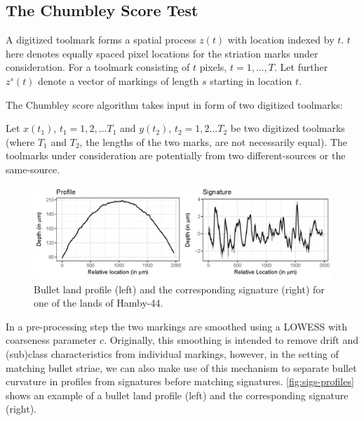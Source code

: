 \documentclass[12pt]{article}
\begin{document}
\subsection{The Chumbley Score Test}\label{the-chumbley-score-test}

A digitized toolmark forms a spatial process \(z(t)\) with location
indexed by \(t\). \(t\) here denotes equally spaced pixel locations for
the striation marks under consideration. For a toolmark consisting of
\(t\) pixels, \(t = 1, ..., T\). Let further \(z^s(t)\) denote a vector
of markings of length \(s\) starting in location \(t\).

The Chumbley score algorithm takes input in form of two digitized
toolmarks:

Let \(x(t_1)\), \(t_1 = 1,2,...T_1\) and \(y(t_2)\), \(t_2 = 1,2...T_2\)
be two digitized toolmarks (where \(T_1\) and \(T_2\), the lengths of
the two marks, are not necessarily equal). The toolmarks under
consideration are potentially from two different-sources or the
same-source.

\begin{figure}

{\centering \includegraphics[width=\textwidth]{figures/sigs-profiles-1} 

}

\caption{Bullet land profile (left) and the corresponding signature (right) for one of the lands of Hamby-44.}\label{fig:sigs-profiles}
\end{figure}

In a pre-processing step the two markings are smoothed using a LOWESS
\citep{lowess} with coarseness parameter \(c\). Originally, this
smoothing is intended to remove drift and (sub)class characteristics
from individual markings, however, in the setting of matching bullet
striae, we can also make use of this mechanism to separate bullet
curvature in profiles from signatures before matching signatures.
\autoref{fig:sigs-profiles} shows an example of a bullet land profile
(left) and the corresponding signature (right).
\end{document}

